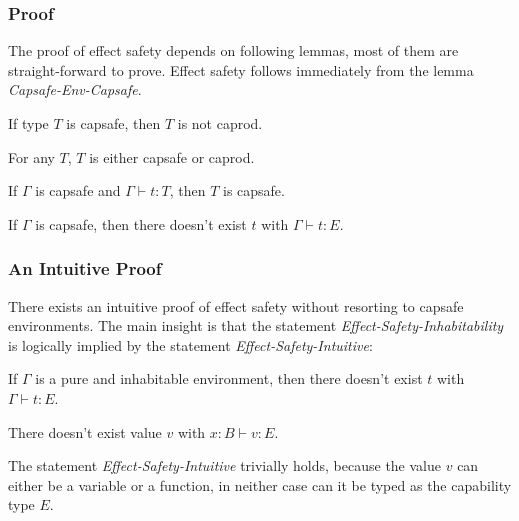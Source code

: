 \subsubsection{Proof}

The proof of effect safety depends on following lemmas, most of them
are straight-forward to prove. Effect safety follows immediately from
the lemma \emph{Capsafe-Env-Capsafe}.


\begin{lemma}
 If type $T$ is capsafe, then $T$ is not caprod.
\end{lemma}

\begin{lemma}
 For any $T$, $T$ is either capsafe or caprod.
\end{lemma}

\begin{lemma}
  If $\Gamma$ is capsafe and $\Gamma \vdash t : T$, then $T$ is capsafe.
\end{lemma}

\begin{theorem}
  If $\Gamma$ is capsafe, then there doesn't exist $t$ with
  $\Gamma \vdash t : E$.
\end{theorem}

\subsubsection{An Intuitive Proof}

There exists an intuitive proof of effect safety without resorting to
capsafe environments. The main insight is that the statement
\emph{Effect-Safety-Inhabitability} is logically implied by the
statement \emph{Effect-Safety-Intuitive}:

\begin{definition}
  If $\Gamma$ is a pure and inhabitable environment, then there
  doesn't exist $t$ with $\Gamma \vdash t : E$.
\end{definition}

\begin{definition}
  There doesn't exist value $v$ with $x:B \vdash v : E$.
\end{definition}

The statement \emph{Effect-Safety-Intuitive} trivially holds, because
the value $v$ can either be a variable or a function, in neither case
can it be typed as the capability type $E$.


